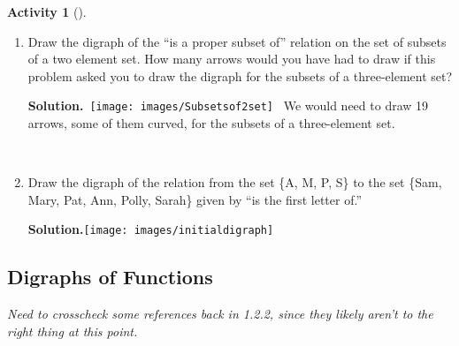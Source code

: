 \documentclass[10pt,]{book}
\theoremstyle{plain}
\theoremstyle{definition}
\newtheorem{activity}[project]{Activity}
\numberwithin{equation}{chapter}
\begin{document}
\begin{activity}[]\label{activity-336}
~\par
\begin{enumerate}[label=(\alph*)]
 \item Draw the digraph of the ``is a proper subset of'' relation on the set of subsets of a two element set. How many arrows would you have had to draw if this problem asked you to draw the digraph for the subsets of a three-element set?%
\par\medskip\noindent%
\textbf{Solution.}\quad \mbox{ \texttt{[image: images/Subsetsof2set]}
 } We would need to draw 19 arrows, some of them curved, for the subsets of a three-element set.%

~\par
\item Draw the digraph of the relation from the set \{A, M, P, S\} to the set \{Sam, Mary, Pat, Ann, Polly, Sarah\} given by ``is the first letter of.''%
\par\medskip\noindent%
\textbf{Solution.}\quad \texttt{[image: images/initialdigraph]}
%

\end{enumerate}
\end{activity}
\typeout{************************************************}
\typeout{************************************************}
\subsection[{Digraphs of Functions}]{Digraphs of Functions}\label{digraphsoffunctions}
\emph{Need to crosscheck some references back in 1.2.2, since they likely aren't to the right thing at this point.}%
\typeout{************************************************}
\typeout{************************************************}
\end{document}
